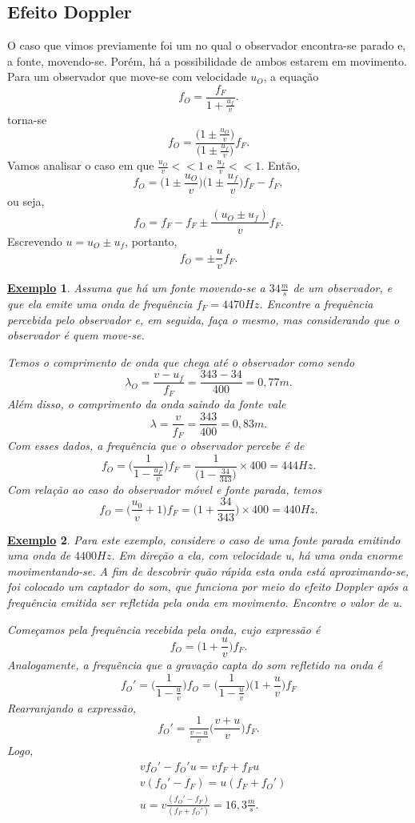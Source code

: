 \documentclass{article}
\newtheorem{example}{\underline{Exemplo}}
\begin{document}
\subsection{Efeito Doppler}
  O caso que vimos previamente foi um no qual o observador encontra-se parado e, a fonte, movendo-se. Porém, há a possibilidade de ambos estarem em movimento. Para um observador que 
move-se com velocidade \(u_{O}\), a equação 
  \[
    f_{O} = \frac{f_{F}}{1+\frac{u_{f}}{v}}.
  \]
torna-se 
  \[
    f_{O} = \frac{\biggl(1\pm \frac{u_{O}}{v}\biggr)}{\biggl(1\pm \frac{u_{f}}{v}\biggr)}f_{F}.
  \]
  Vamos analisar o caso em que \(\frac{u_{O}}{v} << 1\) e \(\frac{u_{f}}{v} << 1\). Então, 
  \[
    f_{O} = \biggl(1\pm \frac{u_{O}}{v}\biggr)\biggl(1\pm \frac{u_{f}}{v}\biggr)f_{F} - f_{F},
  \]
ou seja, 
  \[
    f_{O} = f_{F} - f_{F}\pm \frac{(u_{O}\pm u_{f})}{v}f_{F}.
  \]
  Escrevendo \(u = u_{O} \pm u_{f}\), portanto, 
  \[
    f_{O} = \pm\frac{u}{v}f_{F}.
  \]
\begin{example}
  Assuma que há um fonte movendo-se a \(34 \frac{m}{s}\) de um observador, e que ela emite uma onda de frequência \(f_{F} = 4470Hz\). Encontre a frequência percebida pelo
observador e, em seguida, faça o mesmo, mas considerando que o observador é quem move-se.

  Temos o comprimento de onda que chega até o observador como sendo
  \[
    \lambda_{O} = \frac{v-u_{f}}{f_{F}} = \frac{343-34}{400} = 0,77m.
  \]
Além disso, o comprimento da onda saindo da fonte vale 
  \[
    \lambda = \frac{v}{f_{F}} = \frac{343}{400} = 0,83m.
  \]
  Com esses dados, a frequência que o observador percebe é de 
    \[
      f_{O} = \biggl(\frac{1}{1-\frac{u_{F}}{v}}\biggr)f_{F} = \frac{1}{\biggl(1-\frac{34}{343}\biggr)}\times 400 = 444Hz.
    \]
  Com relação ao caso do observador móvel e fonte parada, temos 
  \[
    f_{O} = \biggl(\frac{u_{0}}{v}+1\biggr)f_{F} = \biggl(1 + \frac{34}{343}\biggr)\times 400 = 440Hz.
  \]
\end{example}
\begin{example}
  Para este exemplo, considere o caso de uma fonte parada emitindo uma onda de \(4400Hz\). Em direção a ela, com velocidade u, há uma onda enorme movimentando-se.
A fim de descobrir quão rápida esta onda está aproximando-se, foi colocado um captador do som, que funciona por meio do efeito Doppler após a frequência emitida ser refletida
pela onda em movimento. Encontre o valor de u.

  Começamos pela frequência recebida pela onda, cujo expressão é 
  \[
    f_{O} = \biggl(1 + \frac{u}{v}\biggr)f_{F}.
  \]
Analogamente, a frequência que a gravação capta do som refletido na onda é 
  \[
    f_{O}' = \biggl(\frac{1}{1-\frac{u}{v}}\biggr)f_{O} = \biggl(\frac{1}{1-\frac{u}{v}}\biggr)\biggl(1+\frac{u}{v}\biggr)f_{F}
  \]
  Rearranjando a expressão, 
  \[
    f_{O}' = \frac{1}{\frac{v-u}{v}}\biggl(\frac{v+u}{v}\biggr)f_{F}.
  \]
  Logo,
 \begin{align*}
   &vf_{O}' - f_{O}'u = vf_{F} + f_{F}u\\
   &v(f_{O}' - f_{F}) = u(f_{F}+f_{O}')\\
   &u = v\frac{(f_{O}'-f_{F})}{(f_{F}+f_{O}')} = 16,3 \frac{m}{s}.
 \end{align*}
\end{example}
\end{document}
